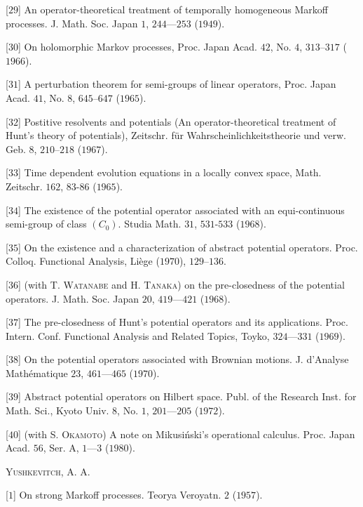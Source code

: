 [$29$] An operator-theoretical treatment of temporally homogeneous Markoff processes. J. Math. Soc. Japan $1$, $244$---$253$ ($1949$). 

[$30$] On holomorphic Markov processes, Proc. Japan Acad. $42$, No. $4$, $313$--$317$ ($1966$). 

[$31$] A perturbation theorem for semi-groups of linear operators, Proc. Japan Acad. $41$, No. $8$, $645$--$647$ ($1965$). 

[$32$] Postitive resolvents and potentials (An operator-theoretical treatment of Hunt's theory of potentials), Zeitschr. für Wahrscheinlichkeitstheorie und verw. Geb. $8$, $210$--$218$ ($1967$). 

[$33$] Time dependent evolution equations in a locally convex space, Math. Zeitschr. $162$, $83$-$86$ ($1965$). 

[$34$] The existence of the potential operator associated with an equi-continuous semi-group of class $(C_0)$. Studia Math. $31$, $531$-$533$ ($1968$). 

[$35$] On the existence and a characterization of abstract potential operators. Proc. Colloq. Functional Analysis, Liège ($1970$), $129$--$136$. 

[$36$] (with T. \textsc{Watanabe} and H. \textsc{Tanaka}) on the pre-closedness of the potential operators. J. Math. Soc. Japan $20$, $419$---$421$ ($1968$). 

[$37$] The pre-closedness of Hunt's potential operators and its applications. Proc. Intern. Conf. Functional Analysis and Related Topics, Toyko, $324$---$331$ ($1969$). 

[$38$] On the potential operators associated with Brownian motions. J. d'Analyse Mathématique $23$, $461$---$465$ ($1970$). 

[$39$] Abstract potential operators on Hilbert space. Publ. of the Research Inst. for Math. Sci., Kyoto Univ. $8$, No. $1$, $201$---$205$ ($1972$). 

[$40$] (with S. \textsc{Okamoto}) A note on Mikusiński's operational calculus. Proc. Japan Acad. $56$, Ser. A, $1$---$3$ ($1980$). 

\textsc{Yushkevitch}, A. A. 

[$1$] On strong Markoff processes. Teorya Veroyatn. $2$ ($1957$). 
